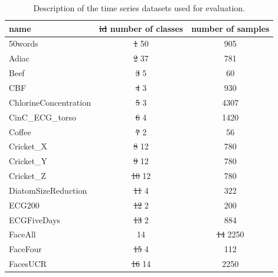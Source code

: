 \documentclass[natbib,smallextended]{svjour3}
\providecommand{\DIFdeltex}[1]{{\protect\color{red}\sout{#1}}}                      %
\providecommand{\DIFdelFL}[1]{\DIFdel{#1}} %
\providecommand{\DIFaddbeginFL}{} %
\providecommand{\DIFaddendFL}{} %
\providecommand{\DIFdelbeginFL}{} %
\providecommand{\DIFdelendFL}{} %
\providecommand{\DIFdel}[1]{\texorpdfstring{\DIFdeltex{#1}}{}} %
\newcommand{\DIFscaledelfig}{0.5}
\newlength{\DIFdelgraphicswidth} %
\newlength{\DIFdelgraphicsheight} %
\newcommand{\DIFaddincludegraphics}[2][]{{\color{blue}\fbox{\DIFOincludegraphics[#1]{#2}}}} %
\newcommand{\DIFdelincludegraphics}[2][]{%
\sbox{\DIFdelgraphicsbox}{\DIFOincludegraphics[#1]{#2}}%
\settoboxwidth{\DIFdelgraphicswidth}{\DIFdelgraphicsbox} %
\settoboxtotalheight{\DIFdelgraphicsheight}{\DIFdelgraphicsbox} %
\scalebox{\DIFscaledelfig}{%
\parbox[b]{\DIFdelgraphicswidth}{\usebox{\DIFdelgraphicsbox}\\[-\baselineskip] \rule{\DIFdelgraphicswidth}{0em}}\llap{\resizebox{\DIFdelgraphicswidth}{\DIFdelgraphicsheight}{%
\setlength{\unitlength}{\DIFdelgraphicswidth}%
\begin{picture}(1,1)%
\thicklines\linethickness{2pt} %
{\color[rgb]{1,0,0}\put(0,0){\framebox(1,1){}}}%
{\color[rgb]{1,0,0}\put(0,0){\line( 1,1){1}}}%
{\color[rgb]{1,0,0}\put(0,1){\line(1,-1){1}}}%
\end{picture}%
}\hspace*{3pt}}} %
} %
\DeclareRobustCommand{\DIFaddbeginFL}{\DIFOaddbeginFL \let\includegraphics\DIFaddincludegraphics} %
\DeclareRobustCommand{\DIFaddendFL}{\DIFOaddendFL \let\includegraphics\DIFOincludegraphics} %
\DeclareRobustCommand{\DIFdelbeginFL}{\DIFOdelbeginFL \let\includegraphics\DIFdelincludegraphics} %
\DeclareRobustCommand{\DIFdelendFL}{\DIFOaddendFL \let\includegraphics\DIFOincludegraphics} %
\begin{document}
\begin{table} [h!]
\begin{center}
\caption{Description of the time series datasets used for evaluation.}
\label{didtNoda1}
\small
 \setlength{\tabcolsep}{.16667em}
\DIFdelbeginFL %
\DIFdelendFL \DIFaddbeginFL \begin{tabular}{lcc}
\DIFaddendFL name & \DIFdelbeginFL \DIFdelFL{id }%
\DIFdelendFL number of classes & number of samples \\
\hline
50words & \DIFdelbeginFL \DIFdelFL{1 }%
\DIFdelendFL 50 &  905 \\
Adiac & \DIFdelbeginFL \DIFdelFL{2 }%
\DIFdelendFL 37 &  781 \\
Beef &  \DIFdelbeginFL \DIFdelFL{3 }%
\DIFdelendFL 5 &   60 \\
CBF  &  \DIFdelbeginFL \DIFdelFL{4 }%
\DIFdelendFL 3 &  930 \\
ChlorineConcentration  &  \DIFdelbeginFL \DIFdelFL{5 }%
\DIFdelendFL 3 & 4307 \\
CinC\_ECG\_torso  &  \DIFdelbeginFL \DIFdelFL{6 }%
\DIFdelendFL 4 & 1420 \\
Coffee  &  \DIFdelbeginFL \DIFdelFL{7 }%
\DIFdelendFL 2 &   56 \\
Cricket\_X  & \DIFdelbeginFL \DIFdelFL{8 }%
\DIFdelendFL 12 &  780 \\
Cricket\_Y  & \DIFdelbeginFL \DIFdelFL{9 }%
\DIFdelendFL 12 &  780 \\
Cricket\_Z  & \DIFdelbeginFL \DIFdelFL{10 }%
\DIFdelendFL 12 &  780 \\
DiatomSizeReduction  &  \DIFdelbeginFL \DIFdelFL{11 }%
\DIFdelendFL 4 &  322 \\
ECG200  &  \DIFdelbeginFL \DIFdelFL{12 }%
\DIFdelendFL 2 &  200 \\
ECGFiveDays  &  \DIFdelbeginFL \DIFdelFL{13 }%
\DIFdelendFL 2 &  884 \\
FaceAll &  14 & \DIFdelbeginFL \DIFdelFL{14 }%
\DIFdelendFL 2250 \\
FaceFour &   \DIFdelbeginFL \DIFdelFL{15 }%
\DIFdelendFL 4 &  112 \\
FacesUCR &  \DIFdelbeginFL \DIFdelFL{16 }%
\DIFdelendFL 14 & 2250 \\

\end{tabular}
\end{center}
\end{table}
\end{document}
